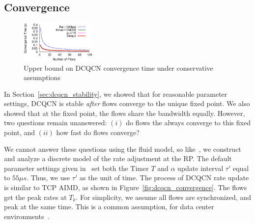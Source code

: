 \subsection{Convergence}
\label{sec:dcqcn_convergence}


\begin{figure}[t]
\centering
\includegraphics[width=0.33\textwidth]{figures/dcqcn_convergence_time.eps}
\vspace{-1em}
\caption{Upper bound on DCQCN convergence time under conservative assumptions}
\vspace{-1em}
\label{fig:dcqcn_convergence_time}
\end{figure}
\fi

In Section~\ref{sec:dcqcn_stability}, we showed that for reasonable parameter
settings,  DCQCN is stable {\em after} flows converge to the unique fixed point.
We also showed that at the fixed point, the flows share the bandwidth equally.
However, two questions remain unanswered: $(i)$ do flows the always converge
to this fixed point, and $(ii)$ how fast do flows converge? 

We cannot answer these questions using the fluid model, so
like~\cite{dctcp-analysis}, we construct and analyze a discrete model of the
rate adjustment at the RP. The default parameter settings given in~\cite{dcqcn}
set both the Timer $T$ and $\alpha$ update interval $\tau '$ equal to $55\mu s$.
Thus, we use $\tau '$ as the unit of time.  The process of DCQCN rate update is
similar to TCP AIMD, as shown in Figure~\ref{fig:dcqcn_convergence}.  The flows
get the peak rates at $T_k$. For simplicity, we assume all flows are
synchronized, and peak at the same time.  This is a common assumption, for data
center environments~\cite{dctcp-analysis}.


